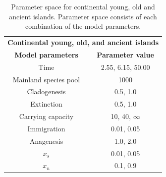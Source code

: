\begin{table}[h]
    \centering
    \caption{Parameter space for continental young, old and ancient islands. Parameter space consists of each combination of the model parameters.}
    \begin{tabular}{ c | c }
        \multicolumn{2}{c}{\textbf{Continental young, old, and ancient islands}} \\
        \textbf{Model parameters} & \textbf{Parameter value} \\ 
        \hline
        \hline
        Time & 2.55, 6.15, 50.00 \\
        \hline
        Mainland species pool & 1000 \\
        \hline
        Cladogenesis & 0.5, 1.0 \\
        \hline
        Extinction & 0.5, 1.0 \\
        \hline
        Carrying capacity & 10, 40, $\infty$ \\
        \hline
        Immigration & 0.01, 0.05 \\
        \hline
        Anagenesis & 1.0, 2.0 \\
        \hline
        $x_s$ & 0.01, 0.05 \\
        \hline
        $x_n$ & 0.1, 0.9 \\
    \end{tabular}
    \label{tab:oceanic_ontogeny_sea_level_young}
\end{table}

